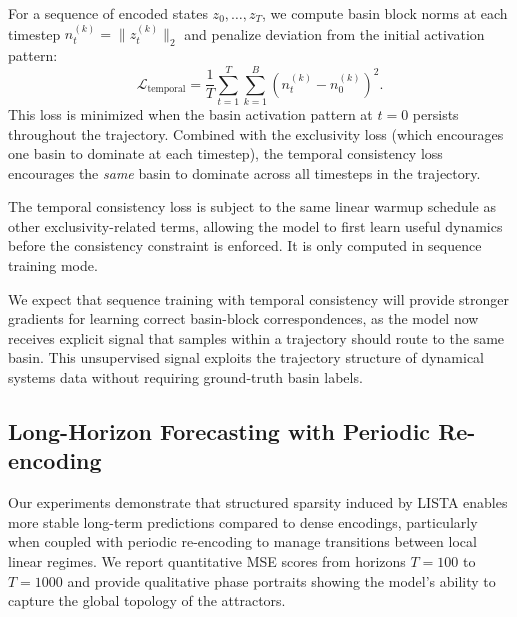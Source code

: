For a sequence of encoded states $z_0, \ldots, z_T$, we compute basin block norms at each timestep $n_t^{(k)} = \| z_t^{(k)} \|_2$ and penalize deviation from the initial activation pattern:
\begin{equation}
    \mathcal{L}_{\text{temporal}} = \frac{1}{T} \sum_{t=1}^{T} \sum_{k=1}^{B} \left( n_t^{(k)} - n_0^{(k)} \right)^2.
\end{equation}
This loss is minimized when the basin activation pattern at $t=0$ persists throughout the trajectory. Combined with the exclusivity loss (which encourages one basin to dominate at each timestep), the temporal consistency loss encourages the \emph{same} basin to dominate across all timesteps in the trajectory.

The temporal consistency loss is subject to the same linear warmup schedule as other exclusivity-related terms, allowing the model to first learn useful dynamics before the consistency constraint is enforced. It is only computed in sequence training mode.

We expect that sequence training with temporal consistency will provide stronger gradients for learning correct basin-block correspondences, as the model now receives explicit signal that samples within a trajectory should route to the same basin. This unsupervised signal exploits the trajectory structure of dynamical systems data without requiring ground-truth basin labels.

\subsection{Long-Horizon Forecasting with Periodic Re-encoding}

Our experiments demonstrate that structured sparsity induced by LISTA enables more stable long-term predictions compared to dense encodings, particularly when coupled with periodic re-encoding to manage transitions between local linear regimes. We report quantitative MSE scores from horizons $T=100$ to $T=1000$  and provide qualitative phase portraits showing the model's ability to capture the global topology of the attractors.


